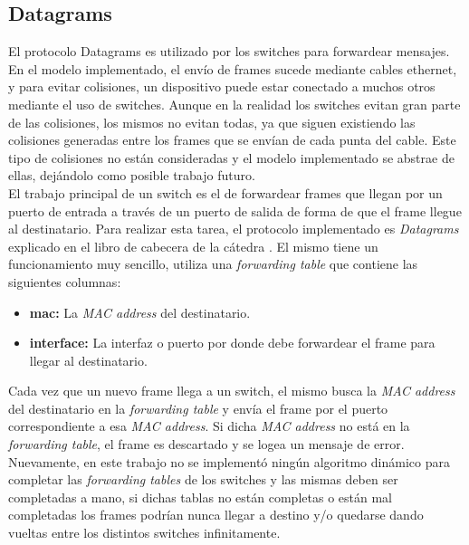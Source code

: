 \documentclass[10pt,a4paper]{article}
\begin{document}
\subsection{Datagrams}
El protocolo Datagrams es utilizado por los switches para forwardear mensajes. \\

En el modelo implementado, el envío de frames sucede mediante cables ethernet, y para evitar colisiones, un dispositivo puede estar conectado a muchos otros mediante el uso de switches. Aunque en la realidad los switches evitan gran parte de las colisiones, los mismos no evitan todas, ya que siguen existiendo las colisiones generadas entre los frames que se envían de cada punta del cable. Este tipo de colisiones no están consideradas y el modelo implementado se abstrae de ellas, dejándolo como posible trabajo futuro. \\

El trabajo principal de un switch es el de forwardear frames que llegan por un puerto de entrada a través de un puerto de salida de forma de que el frame llegue al destinatario. Para realizar esta tarea, el protocolo implementado es \textit{Datagrams} explicado en el libro de cabecera de la cátedra \cite[p.~172]{peterson2011computer}. El mismo tiene un funcionamiento muy sencillo, utiliza una \textit{forwarding table} que contiene las siguientes columnas: \\

\begin{itemize}
\item \textbf{mac: } La \textit{MAC address} del destinatario.
\item \textbf{interface: } La interfaz o puerto por donde debe forwardear el frame para llegar al destinatario.
\end{itemize}

Cada vez que un nuevo frame llega a un switch, el mismo busca la \textit{MAC address} del destinatario en la \textit{forwarding table} y envía el frame por el puerto correspondiente a esa \textit{MAC address}. Si dicha \textit{MAC address} no está en la \textit{forwarding table}, el frame es descartado y se logea un mensaje de error. \\

Nuevamente, en este trabajo no se implementó ningún algoritmo dinámico para completar las \textit{forwarding tables} de los switches y las mismas deben ser completadas a mano, si dichas tablas no están completas o están mal completadas los frames podrían nunca llegar a destino y/o quedarse dando vueltas entre los distintos switches infinitamente. \\
\end{document}
